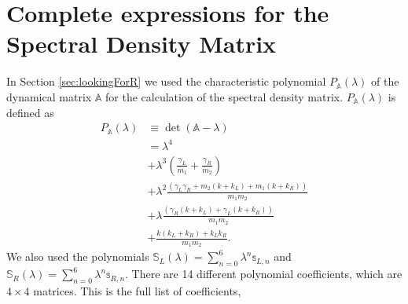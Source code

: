 
\chapter{Complete expressions for the Spectral Density Matrix}
\label{Appendix:SpectralDensity}

%
In Section \ref{sec:lookingForR} we used the characteristic polynomial $P_{\mathbb{A}}(\lambda)$ of the dynamical matrix $\mathbb{A}$ for the calculation of the spectral density matrix. $P_{\mathbb{A}}(\lambda)$ is defined as
\begin{equation}
  \begin{split}
    P_{\mathbb{A}}(\lambda) &\equiv\det(\mathbb{A}-\lambda)\\
    &= \lambda ^4 \\&+ \lambda ^3 \left(\frac{\gamma_L}{m_1}+\frac{\gamma_R}{m_2}\right) \\ &+ \lambda^2\frac{ (\gamma_L \gamma_R+m_2 (k+k_L)+m_1 (k+k_R))}{m_1 m_2}\\ &+ \lambda \frac{  (\gamma_R (k+k_L)+\gamma_L (k+k_R))}{m_1 m_2}\\ &+\frac{k (k_L+k_R)+k_L k_R}{m_1 m_2}.
  \end{split}
\end{equation}
%
We also used the polynomials  $\mathbb{S}_L(\lambda)=\sum\limits_{n=0}^6 \lambda^n \mathbb{s}_{L,n}$ and $\mathbb{S}_R(\lambda)=\sum\limits_{n=0}^6 \lambda^n \mathbb{s}_{R,n}$. There are 14 different polynomial coefficients, which are $4\times 4$ matrices. This is the full list of coefficients,
%
\begingroup
\allowdisplaybreaks
